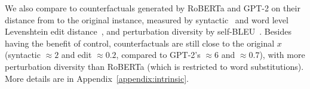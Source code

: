 We also compare \sysname to counterfactuals generated by RoBERTa and GPT-2 on their distance from to the original instance, measured by syntactic~\cite{zhang1989simple} and word level Levenshtein edit distance~\cite{levenshtein1966binary}, and perturbation diversity by self-BLEU~\cite{zhu2018texygen}. 
Besides having the benefit of control, \sysname counterfactuals are still close to the original $x$ (syntactic $\approx 2$ and edit $\approx 0.2$, compared to GPT-2's $\approx 6$ and $\approx 0.7$), with more perturbation diversity than RoBERTa (which is restricted to word substitutions).
More details are in Appendix~\ref{appendix:intrinsic}.



